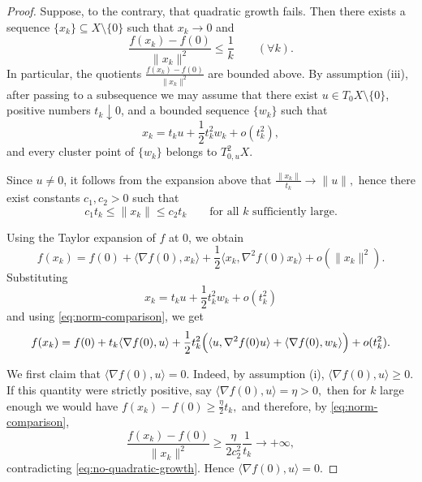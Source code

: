 \documentclass[10pt,reqno]{amsart}
\theoremstyle{break-italic}
\theoremstyle{break-italic}
\theoremstyle{break-italic}
\theoremstyle{break-italic}
\theoremstyle{break-italic}
\theoremstyle{break-italic}
\theoremstyle{break-italic}
\theoremstyle{break-italic}
\theoremstyle{break-roman}
\theoremstyle{standard}
\theoremstyle{varthm-roman}
\theoremstyle{varthm-italic}
\theoremstyle{varthm-roman-break}
\theoremstyle{varthm-italic-break}
\theoremstyle{varthm-roman-no-punctuation}
\theoremstyle{varthm-italic-no-punctuation}
\numberwithin{equation}{section}
\begin{document}
\begin{proof}
Suppose, to the contrary, that quadratic growth fails. Then there exists a
sequence $\{x_k\}\subseteq X\setminus\{0\}$ such that $x_k\to 0$ and
\begin{equation}\label{eq:no-quadratic-growth}
\frac{f(x_k)-f(0)}{\|x_k\|^2}\le \frac1k
\qquad (\forall k).
\end{equation}
In particular, the quotients
\(
\frac{f(x_k)-f(0)}{\|x_k\|^2}
\)
are bounded above. By assumption {\rm(iii)}, after passing to a subsequence we
may assume that there exist $u\in T_0X\setminus\{0\}$, positive numbers
$t_k\downarrow 0$, and a bounded sequence $\{w_k\}$ such that
\[
x_k=t_k u+\frac12 t_k^2w_k+o(t_k^2),
\]
and every cluster point of $\{w_k\}$ belongs to $T^2_{0,u}X$.

Since $u\neq 0$, it follows from the expansion above that
\(
\frac{\|x_k\|}{t_k}\to \|u\|,
\)
hence there exist constants $c_1,c_2>0$ such that
\begin{equation}\label{eq:norm-comparison}
c_1 t_k \le \|x_k\| \le c_2 t_k
\qquad \text{for all } k \text{ sufficiently large}.
\end{equation}

Using the Taylor expansion of $f$ at $0$, we obtain
\[
f(x_k)=f(0)
+\langle \nabla f(0),x_k\rangle
+\frac12\langle x_k,\nabla^2 f(0)x_k\rangle
+o(\|x_k\|^2).
\]
Substituting
\[
x_k=t_k u+\frac12 t_k^2w_k+o(t_k^2)
\]
and using \eqref{eq:norm-comparison}, we get
\[
f(x_k)=f(0)
+t_k\langle \nabla f(0),u\rangle
+\frac12 t_k^2
\Bigl(
\langle u,\nabla^2 f(0)u\rangle
+
\langle \nabla f(0),w_k\rangle
\Bigr)
+o(t_k^2).
\]

We first claim that
\(
\langle \nabla f(0),u\rangle =0.
\)
Indeed, by assumption {\rm(i)},
\(
\langle \nabla f(0),u\rangle \ge 0.
\)
If this quantity were strictly positive, say
\(
\langle \nabla f(0),u\rangle =\eta>0,
\)
then for $k$ large enough we would have
\(
f(x_k)-f(0)\ge \frac{\eta}{2}t_k,
\)
and therefore, by \eqref{eq:norm-comparison},
\[
\frac{f(x_k)-f(0)}{\|x_k\|^2}
\ge \frac{\eta}{2c_2^2}\frac{1}{t_k}\to +\infty,
\]
contradicting \eqref{eq:no-quadratic-growth}. Hence
\(
\langle \nabla f(0),u\rangle =0.
\)


\end{proof}
\end{document}
